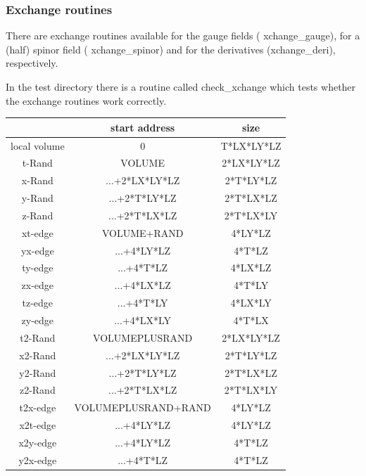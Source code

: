 \subsubsection{Exchange routines}

There are exchange routines available for the gauge fields ({\ttfamily
  xchange\_gauge}), for a (half) spinor field ({\ttfamily
  xchange\_spinor}) and for the derivatives ({\ttfamily xchange\_deri}),
respectively.

In the test directory there is a routine called {\ttfamily
  check\_xchange} which tests whether the exchange routines work correctly.


\begin{table}[t]
  \centering
  \begin{tabular*}{1.\textwidth}{@{\extracolsep{\fill}}ccc}
    \hline\hline
     & start address & size \\
    \hline\hline
    local volume & 0 & T*LX*LY*LZ \\
    \hline\hline
    t-Rand       & VOLUME & 2*LX*LY*LZ \\
    x-Rand       & ...+2*LX*LY*LZ & 2*T*LY*LZ\\
    y-Rand       & ...+2*T*LY*LZ & 2*T*LX*LZ \\
    z-Rand       & ...+2*T*LX*LZ & 2*T*LX*LY  \\
    \hline\hline
    xt-edge      & VOLUME+RAND  & 4*LY*LZ \\
    yx-edge      & ...+4*LY*LZ  & 4*T*LZ \\
    ty-edge      & ...+4*T*LZ   & 4*LX*LZ \\
    zx-edge      & ...+4*LX*LZ  & 4*T*LY\\
    tz-edge      & ...+4*T*LY   & 4*LX*LY\\
    zy-edge      & ...+4*LX*LY  & 4*T*LX\\
    \hline\hline
    t2-Rand      & VOLUMEPLUSRAND & 2*LX*LY*LZ \\
    x2-Rand      & ...+2*LX*LY*LZ & 2*T*LY*LZ \\
    y2-Rand      & ...+2*T*LY*LZ  & 2*T*LX*LZ \\
    z2-Rand      & ...+2*T*LX*LZ  & 2*T*LX*LY \\
    \hline\hline
    t2x-edge     & VOLUMEPLUSRAND+RAND & 4*LY*LZ \\
    x2t-edge     & ...+4*LY*LZ         & 4*LY*LZ \\
    x2y-edge     & ...+4*LY*LZ         & 4*T*LZ \\
    y2x-edge     & ...+4*T*LZ          & 4*T*LZ \\

\end{tabular*}
\end{table}
